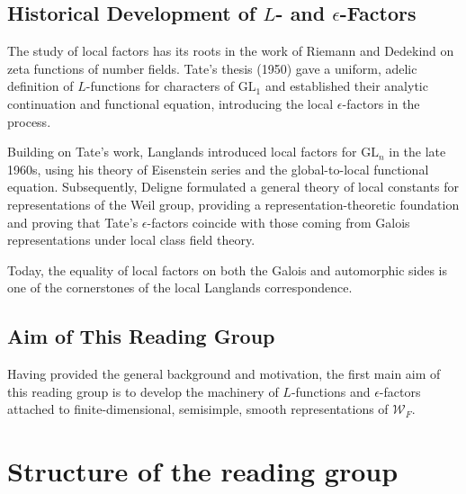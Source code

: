 \documentclass[11pt]{amsart}
\begin{document}
 
\bigskip

\subsection{Historical Development of $L$- and $\epsilon$-Factors}

The study of local factors has its roots in the work of Riemann and 
Dedekind on zeta functions of number fields. 
Tate's thesis (1950) gave a uniform, adelic definition of $L$-functions 
for characters of $\mathrm{GL}_1$ and established their analytic continuation 
and functional equation, introducing the local $\epsilon$-factors in the process.

Building on Tate’s work, Langlands introduced local factors for 
$\mathrm{GL}_n$ in the late 1960s, using his theory of Eisenstein series 
and the global-to-local functional equation. 
Subsequently, Deligne formulated a general theory of local constants 
for representations of the Weil group, providing a representation-theoretic 
foundation and proving that Tate’s $\epsilon$-factors coincide with those 
coming from Galois representations under local class field theory.

Today, the equality of local factors on both the Galois and automorphic sides 
is one of the cornerstones of the local Langlands correspondence.



\bigskip


\subsection{Aim of This Reading Group}

Having provided the general background and motivation, 
the first main aim of this reading group is to develop the 
machinery of $L$-functions and $\epsilon$-factors attached to 
finite-dimensional, semisimple, smooth representations of 
\(\mathcal{W}_F\).

\section{Structure of the reading group}
\end{document}
